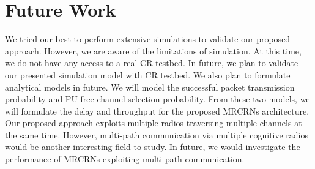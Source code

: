 \chapter{Future Work}
We tried our best to perform extensive simulations to validate our proposed approach. However, we are aware of the limitations of simulation. At this time, we do not have any access to a real CR testbed. In future, we plan to validate our presented simulation model with CR testbed. We also plan to formulate analytical models in future. We will model the successful packet transmission probability and PU-free channel selection probability. From these two models, we will formulate the delay and throughput for the proposed MRCRNs architecture. Our proposed approach exploits multiple radios traversing multiple channels at the same time. However, multi-path communication via multiple cognitive radios would be another interesting field to study. In future, we would investigate the performance of MRCRNs exploiting multi-path communication.
\endinput
